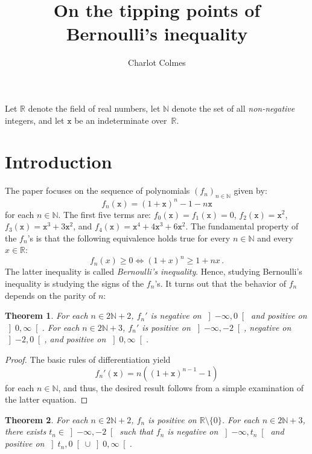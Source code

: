 \documentclass[12pt]{article}
\newcommand{\bR}{\mathbb{R}}
\newcommand{\bN}{\mathbb{N}}
\newcommand{\gtint}[1]{\left] #1, \infty \right[}
\newcommand{\ltint}[1]{\left]- \infty, #1 \right[}
\newcommand{\ttx}{\mathtt{x}}
\newtheorem{theorem}{Theorem}
\begin{document}
\title{On the tipping points of Bernoulli's inequality}
\author{Charlot Colmes}
\maketitle 

\sloppy

Let $\bR$ denote the field of real numbers,
let $\bN$ denote the set of all \emph{non-negative} integers, and 
let $\ttx$ be an indeterminate over~$\bR$.

\section{Introduction}

The paper focuses on the sequence  of polynomials $\left( f_n \right)_{n \in \bN}$ given by:
\begin{equation} \label{eq:def-fn}
f_n(\ttx) = {(1 + \ttx)}^n - 1 - n \ttx  
\end{equation}
for each $n \in \bN$.
The first five terms are:
$f_0(\ttx) = f_1(\ttx) = 0$,
$f_2(\ttx) = \ttx^2$,
$f_3(\ttx) = \ttx^3 + 3 \ttx^2$, and
$f_4(\ttx) = \ttx^4 + 4 \ttx^3 + 6 \ttx^2$.
The fundamental property of the $f_n$'s is that
the following equivalence holds true for every $n \in \bN$ and every $x \in \bR$:
$$
f_n(x) \ge 0 \iff {(1 + x)}^n \ge 1 + n x \,.
$$ 
The latter inequality is called \emph{Bernoulli's inequality}.
Hence, studying Bernoulli's inequality is studying the signs of the $f_n$'s.
It turns out that the behavior of $f_n$ depends on the parity of $n$:


\begin{theorem} \label{thm:variation}
   For each $n \in 2 \bN + 2$,
   $f_n'$ is
   negative on $\ltint{0}$ and
   positive on $\gtint{0}$.
   For each $n \in 2 \bN + 3$, $f_n'$ is
   positive on $\ltint{- 2}$,
   negative on $\left]- 2, 0 \right[$, and
   positive on $\gtint{0}$.
 \end{theorem}

 \begin{proof}
   The basic rules of differentiation yield 
\begin{equation} \label{eq:deriv-fn} 
  f_n'(\ttx)  = n \left( {(1 + \ttx)}^{n - 1} -  1 \right) 
\end{equation}
for each $n \in \bN$,
and thus, the desired result follows from a simple examination of the latter equation.
\end{proof} 


 \begin{theorem} \label{thm:Bernoulli}
   For each $n \in 2 \bN + 2$,
   $f_n$ is positive on $\bR \setminus \{ 0 \}$. 
   For each  $n \in 2 \bN + 3$,
   there exists $t_n \in  \ltint{-2}$
   such that $f_n$ is
   negative on $\ltint{t_n}$ and
   positive on $\left]t_n,  0\right[ \cup \gtint{0}$.
 \end{theorem}
 
\end{document}
